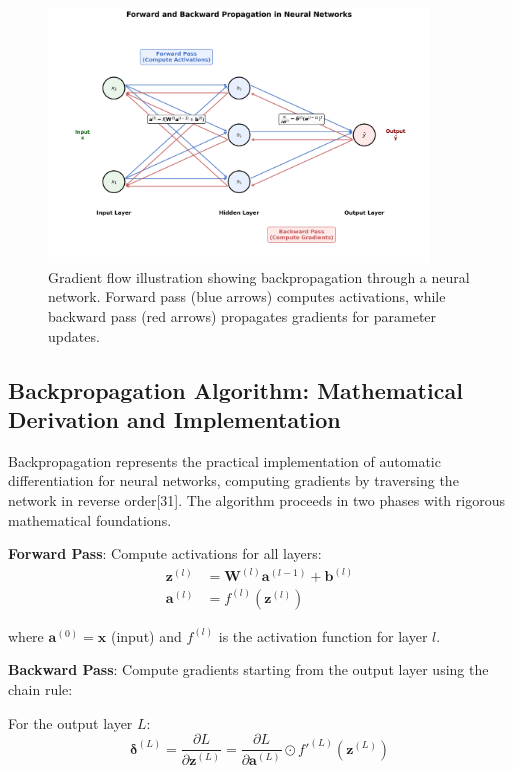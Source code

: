 \documentclass[11pt,a4paper]{report}
\begin{document}
\begin{figure}[H]
\centering
\includegraphics[width=0.9\textwidth]{gradient_flow_diagram.png}
\caption{Gradient flow illustration showing backpropagation through a neural network. Forward pass (blue arrows) computes activations, while backward pass (red arrows) propagates gradients for parameter updates.}
\label{fig:gradient_flow}
\end{figure}

\subsection{Backpropagation Algorithm: Mathematical Derivation and Implementation}

Backpropagation represents the practical implementation of automatic differentiation for neural networks, computing gradients by traversing the network in reverse order[31]. The algorithm proceeds in two phases with rigorous mathematical foundations.

\textbf{Forward Pass}: Compute activations for all layers:
\begin{align}
\mathbf{z}^{(l)} &= \mathbf{W}^{(l)} \mathbf{a}^{(l-1)} + \mathbf{b}^{(l)} \\
\mathbf{a}^{(l)} &= f^{(l)}(\mathbf{z}^{(l)})
\end{align}

where $\mathbf{a}^{(0)} = \mathbf{x}$ (input) and $f^{(l)}$ is the activation function for layer $l$.

\textbf{Backward Pass}: Compute gradients starting from the output layer using the chain rule:

For the output layer $L$:
\begin{equation}
\boldsymbol{\delta}^{(L)} = \frac{\partial L}{\partial \mathbf{z}^{(L)}} = \frac{\partial L}{\partial \mathbf{a}^{(L)}} \odot f'^{(L)}(\mathbf{z}^{(L)})
\end{equation}
\end{document}
